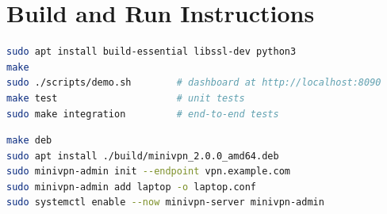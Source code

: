 \documentclass[12pt,a4paper]{report}
\begin{document}
\appendix
\chapter{Build and Run Instructions}
\begin{lstlisting}[language=bash,numbers=none,caption={Quick demo on Linux or WSL2}]
sudo apt install build-essential libssl-dev python3
make
sudo ./scripts/demo.sh        # dashboard at http://localhost:8090
make test                     # unit tests
sudo make integration         # end-to-end tests
\end{lstlisting}

\begin{lstlisting}[language=bash,numbers=none,caption={Installing as a service}]
make deb
sudo apt install ./build/minivpn_2.0.0_amd64.deb
sudo minivpn-admin init --endpoint vpn.example.com
sudo minivpn-admin add laptop -o laptop.conf
sudo systemctl enable --now minivpn-server minivpn-admin
\end{lstlisting}
\end{document}
